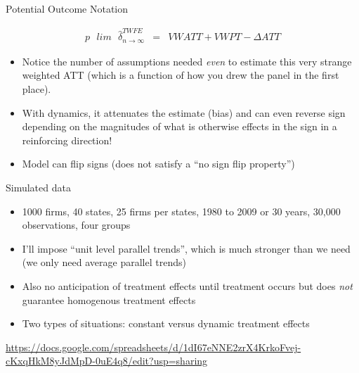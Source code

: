 \documentclass{beamer}
\begin{document}
\begin{frame}{Potential Outcome Notation}

\begin{eqnarray*}
p\text{ }lim\text{ } \widehat{\delta}^{TWFE}_{n\to\infty} &=& VWATT + VWPT - \Delta ATT
\end{eqnarray*}

\begin{itemize}
\item Notice the number of assumptions needed \emph{even} to estimate this very strange weighted ATT (which is a function of how you drew the panel in the first place). 
\item With dynamics, it attenuates the estimate (bias) and can even reverse sign depending on the magnitudes of what is otherwise effects in the sign in a reinforcing direction! 
\item Model can flip signs (does not satisfy a ``no sign flip property'')
\end{itemize}

\end{frame}



\begin{frame}{Simulated data}

\begin{itemize}
\item 1000 firms, 40 states, 25 firms per states, 1980 to 2009 or 30 years, 30,000 observations, four groups

\item I'll impose ``unit level parallel trends'', which is much stronger than we need (we only need average parallel trends)

\item Also no anticipation of treatment effects until treatment occurs but does \emph{not} guarantee homogenous treatment effects

\item Two types of situations: constant versus dynamic treatment effects
\end{itemize}

\bigskip

\url{https://docs.google.com/spreadsheets/d/1dI67eNNE2zrX4KrkoFvej-cKxqHkM8yJdMpD-0uE4q8/edit?usp=sharing}
\end{frame}
\end{document}
